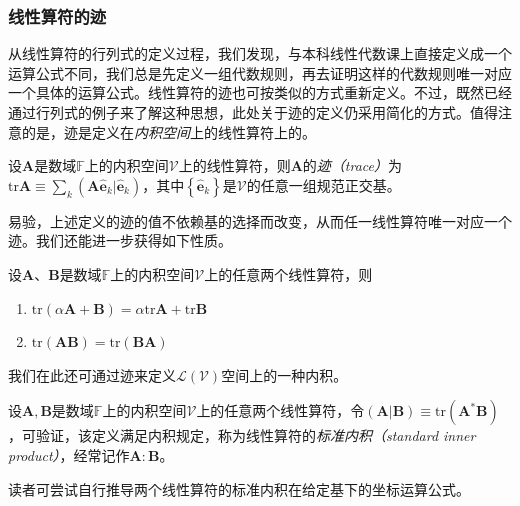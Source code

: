 \documentclass[main.tex]{subfiles}
\begin{document}
\subsubsection{线性算符的迹}
从线性算符的行列式的定义过程，我们发现，与本科线性代数课上直接定义成一个运算公式不同，我们总是先定义一组代数规则，再去证明这样的代数规则唯一对应一个具体的运算公式。线性算符的迹也可按类似的方式重新定义。不过，既然已经通过行列式的例子来了解这种思想，此处关于迹的定义仍采用简化的方式。值得注意的是，迹是定义在\emph{内积空间}上的线性算符上的。

\begin{definition}[线性算符的迹]\label{def:II.2.19}
    设$\mathbf{A}$是数域$\mathbb{F}$上的内积空间$\mathcal{V}$上的线性算符，则$\mathbf{A}$的\emph{迹（trace）}为$\mathrm{tr}\mathbf{A}\equiv\sum_k\left(\mathbf{A}\mathbf{\hat{e}}_k|\mathbf{\hat{e}}_k\right)$，其中$\left\{\mathbf{\hat{e}}_k\right\}$是$\mathcal{V}$的任意一组规范正交基。
\end{definition}

易验，上述定义的迹的值不依赖基的选择而改变，从而任一线性算符唯一对应一个迹。我们还能进一步获得如下性质。

\begin{theorem}\label{thm:II.2.25}
    设$\mathbf{A}$、$\mathbf{B}$是数域$\mathbb{F}$上的内积空间$\mathcal{V}$上的任意两个线性算符，则
    \begin{enumerate}
        \item $\mathrm{tr}\left(\alpha\mathbf{A}+\mathbf{B}\right)=\alpha\mathrm{tr}\mathbf{A}+\mathrm{tr}\mathbf{B}$
        \item $\mathrm{tr}\left(\mathbf{AB}\right)=\mathrm{tr}\left(\mathbf{BA}\right)$
    \end{enumerate}
\end{theorem}

我们在此还可通过迹来定义$\mathcal{L}\left(\mathcal{V}\right)$空间上的一种内积。

\begin{definition}[线性算符的标准内积]\label{def:II.2.20}
    设$\mathbf{A},\mathbf{B}$是数域$\mathbb{F}$上的内积空间$\mathcal{V}$上的任意两个线性算符，令$\left(\mathbf{A}|\mathbf{B}\right)\equiv\mathrm{tr}\left(\mathbf{A}^*\mathbf{B}\right)$，可验证，该定义满足内积规定，称为线性算符的\emph{标准内积（standard inner product）}，经常记作$\mathbf{A}:\mathbf{B}$。
\end{definition}

读者可尝试自行推导两个线性算符的标准内积在给定基下的坐标运算公式。

\end{document}
